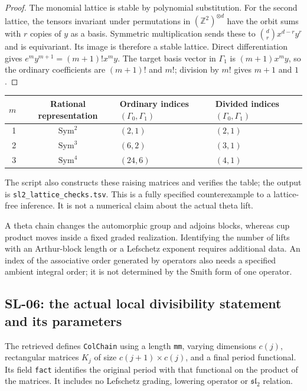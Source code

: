 \documentclass[11pt,a4paper]{article}
\theoremstyle{remark}
\begin{document}
\begin{proof}
The monomial lattice is stable by polynomial substitution.  For the second
lattice, the tensors invariant under permutations in $(\mathbb Z^2)^{\otimes d}$
have the orbit sums with $r$ copies of $y$ as a basis.  Symmetric
multiplication sends these to $\binom drx^{d-r}y^r$ and is equivariant.
Its image is therefore a stable lattice.  Direct differentiation gives
$e^my^{m+1}=(m+1)!x^my$.  The target basis vector in $\Gamma_1$ is
$(m+1)x^my$, so the ordinary coefficients are $(m+1)!$ and $m!$;
division by $m!$ gives $m+1$ and $1$.
\end{proof}

\begin{center}
\begin{tabular}{rcll}
\toprule
$m$&Rational representation&Ordinary indices $(\Gamma_0,\Gamma_1)$
&Divided indices $(\Gamma_0,\Gamma_1)$\\
\midrule
1&$\operatorname{Sym}^2$&$(2,1)$&$(2,1)$\\
2&$\operatorname{Sym}^3$&$(6,2)$&$(3,1)$\\
3&$\operatorname{Sym}^4$&$(24,6)$&$(4,1)$\\
\bottomrule
\end{tabular}
\end{center}
The script also constructs these raising matrices and verifies the table;
the output is \texttt{sl2\_lattice\_checks.tsv}.  This is a fully specified
counterexample to a lattice-free inference.  It is not a numerical claim
about the actual theta lift.

A theta chain changes the automorphic group and adjoins blocks, whereas
cup product moves inside a fixed graded realization.  Identifying the
number of lifts with an Arthur-block length or a Lefschetz exponent requires
additional data.  An index of the associative order generated by operators
also needs a specified ambient integral order; it is not determined by the
Smith form of one operator.

\subsection{SL-06: the actual local divisibility statement and its parameters}
\label{sl:actual-code}

The retrieved 
defines \texttt{ColChain} using a length \texttt{mm}, varying dimensions
$c(j)$, rectangular matrices $K_j$ of size $c(j+1)\times c(j)$, and a
final period functional.  Its field \texttt{fact} identifies the original
period with that functional on the product of the matrices.  It includes
no Lefschetz grading, lowering operator or $\mathfrak{sl}_2$ relation.
\end{document}
